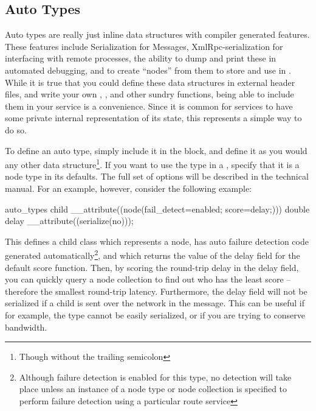\subsection{Auto Types}
\label{sec:autotype}

Auto types are really just inline data structures with compiler generated
features.  These features include Serialization for Messages,
XmlRpc-serialization for interfacing with remote processes, the ability to dump
and print these in automated debugging, and to create ``nodes'' from them to
store and use in .  While it is true that you could
define these data structures in external header files, and write your own
, , and other sundry functions, being
able to include them in your service is a convenience.  Since it is common for
services to have some private internal representation of its state, this
represents a simple way to do so.

To define an auto type, simply include it in the  block,
and define it as you would any other data structure\footnote{Though without the
trailing semicolon}.  If you want to use the type in a
, specify that it is a node type in its defaults.  The
full set of options will be described in the technical manual.  For an example,
however, consider the following example:

\begin{programlisting}
auto_types {
  child __attribute((node(fail_detect=enabled; score=delay;))) {
    double delay __attribute((serialize(no)));
  }
}
\end{programlisting}

This defines a child class which represents a node, has auto failure detection
code generated automatically\footnote{Although failure detection is enabled for
this type, no detection will take place unless an instance of a node type or
node collection is specified to perform failure detection using a particular
route service}, and which returns the value of the delay field for the default
score function.  Then, by scoring the round-trip delay in the delay field, you
can quickly query a node collection to find out who has the least score --
therefore the smallest round-trip latency.  Furthermore, the delay field will
not be serialized if a child is sent over the network in the message.  This can
be useful if for example, the type cannot be easily serialized, or if you are
trying to conserve bandwidth.

